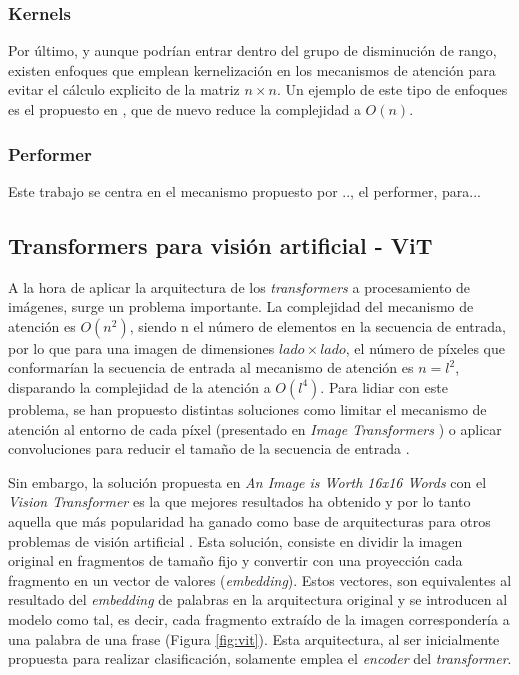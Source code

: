 \subsubsection{Kernels}
Por último, y aunque podrían entrar dentro del grupo de disminución de rango, existen enfoques que emplean kernelización en los mecanismos de atención para evitar el cálculo explicito de la matriz $n \times n$. Un ejemplo de este tipo de enfoques es el propuesto en \cite{kernel-transformer}, que de nuevo reduce la complejidad a $O(n)$.

\subsubsection{Performer}
Este trabajo se centra en el mecanismo propuesto por .., el performer, para...

\subsection{Transformers para visión artificial - ViT}
A la hora de aplicar la arquitectura de los \textit{transformers} a procesamiento de imágenes, surge un problema importante. La complejidad del mecanismo de atención es $O(n^{2})$, siendo n el número de elementos en la secuencia de entrada, por lo que para una imagen de dimensiones $lado \times lado$, el número de píxeles que conformarían la secuencia de entrada al mecanismo de atención es $n = l^2$, disparando la complejidad de la atención a $O(l^{4})$. Para lidiar con este problema, se han propuesto distintas soluciones como limitar el mecanismo de atención al entorno de cada píxel (presentado en \textit{Image Transformers} \cite{image_transformer}) o aplicar convoluciones para reducir el tamaño de la secuencia de entrada \cite{detrfacebookdetectiontransformers}. 

Sin embargo, la solución propuesta en \textit{An Image is Worth 16x16 Words} con el \textit{Vision Transformer} \cite{image16x16words} es la que mejores resultados ha obtenido y por lo tanto aquella que más popularidad ha ganado como base de arquitecturas para otros problemas de visión artificial \cite{visiontransformersDPT, bhat2020adabins, chen2021transunet, liu2021Swin}. Esta solución, consiste en dividir la imagen original en fragmentos de tamaño fijo y convertir con una proyección cada fragmento en un vector de valores (\textit{embedding}). Estos vectores, son equivalentes al resultado del \textit{embedding} de palabras en la arquitectura original y se introducen al modelo como tal, es decir, cada fragmento extraído de la imagen correspondería a una palabra de una frase (Figura \ref{fig:vit}). Esta arquitectura, al ser inicialmente propuesta para realizar clasificación, solamente emplea el \textit{encoder} del \textit{transformer}.

